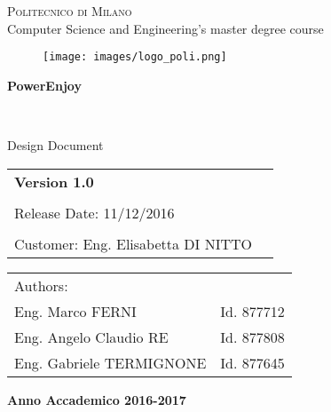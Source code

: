 \documentclass[a4paper,12pt,oneside]{report}
\begin{document}

\thispagestyle{empty}
\enlargethispage{60mm}
\begin{center}
\Large{\textsc{Politecnico di Milano}}\\
\vspace{5mm}
\large{Computer Science and Engineering's master degree course }\\
\vspace{10mm}
\begin{figure}[h]
\begin{center}
\texttt{[image: images/logo\_poli.png]}
\end{center}
\end{figure}
\vspace{5mm}

\begin{LARGE}
\textbf{PowerEnjoy}
\end{LARGE}
\\
\begin{LARGE}
Design Document
\end{LARGE}
\vspace{30mm}

\begin{flushleft}
\begin{tabular}{l l }
\textbf{Version 1.0}\\\\
Release Date: 11/12/2016\\\\
Customer: Eng. Elisabetta DI NITTO
\end{tabular}
\end{flushleft}
\vspace{30mm}

\begin{flushright}
\begin{tabular}{l l}
Authors:\\
Eng. Marco FERNI & Id. 877712\\
Eng. Angelo Claudio RE & Id. 877808 \\
Eng. Gabriele TERMIGNONE & Id. 877645 \\
\end{tabular}
\end{flushright}
\vfill
{\large{\bf Anno Accademico 2016-2017}}
\end{center}
\end{document}
